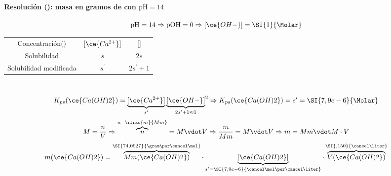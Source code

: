 \begin{frame}
	\frametitle{\ejerciciocmd}
	\framesubtitle{Resolución (): masa en gramos de  con $\mathrm{pH}=14$}
	$$
		\mathrm{pH}=14\Rightarrow\mathrm{pOH}=0\Rightarrow[\ce{OH-}]=\SI{1}{\Molar}
	$$
	\begin{center}
		\begin{tabular}{ccc}
			\toprule
			Concentración(\si{\Molar}) & $[\ce{Ca^{2+}}]$ &     [\ce{OH-}]   \\
			Solubilidad                &    $s$    		  &       $2s$       \\
			Solubilidad modificada     &    $s^\prime$          &  $2s^\prime+\num{1}$   \\
			\bottomrule
		\end{tabular}
	\end{center}
	\\[.2cm]
			$$
				K_{ps}(\ce{Ca(OH)2})=\underbrace{[\ce{Ca^{2+}}]}_{s^\prime}{\underbrace{[\ce{OH-}]}_{2s^\prime+1\approx 1}}^2\Rightarrow
				K_{ps}(\ce{Ca(OH)2})=s^\prime=\SI{7,9e-6}{\Molar}
			$$
			$$
				M = \frac{n}{V}\Rightarrow \overbrace{n}^{n=\rfrac{m}{Mm}}=M\vdot V\Rightarrow
				\frac{m}{Mm}=M\vdot V\Rightarrow m=Mm\vdot M\cdot V
			$$
			$$
				m(\ce{Ca(OH)2})=\overbrace{Mm(\ce{Ca(OH)2})}^{\SI{74,0927}{\gram\per\cancel\mol}}\cdot\underbrace{[\ce{Ca(OH)2}]}_{s^\prime=\SI{7,9e-6}{\cancel\mol\per\cancel\liter}}\cdot\overbrace{V(\ce{Ca(OH)2})}^{\SI{,150}{\cancel\liter}}
			$$
		\centering{}
\end{frame}

